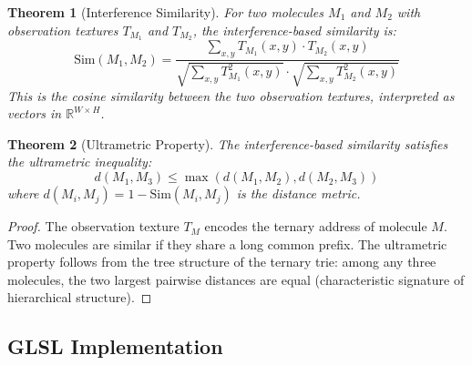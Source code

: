 \documentclass[11pt,a4paper]{article}
\newtheorem{theorem}{Theorem}[section]
\theoremstyle{definition}
\theoremstyle{remark}
\begin{document}
\begin{theorem}[Interference Similarity]
\label{thm:interference_similarity}
For two molecules $M_1$ and $M_2$ with observation textures $T_{M_1}$ and $T_{M_2}$, the interference-based similarity is:
\begin{equation}
\text{Sim}(M_1, M_2) = \frac{\sum_{x,y} T_{M_1}(x,y) \cdot T_{M_2}(x,y)}{\sqrt{\sum_{x,y} T_{M_1}^2(x,y)} \cdot \sqrt{\sum_{x,y} T_{M_2}^2(x,y)}}
\end{equation}
This is the cosine similarity between the two observation textures, interpreted as vectors in $\mathbb{R}^{W \times H}$.
\end{theorem}

\begin{theorem}[Ultrametric Property]
\label{thm:ultrametric_similarity}
The interference-based similarity satisfies the ultrametric inequality:
\begin{equation}
d(M_1, M_3) \leq \max(d(M_1, M_2), d(M_2, M_3))
\end{equation}
where $d(M_i, M_j) = 1 - \text{Sim}(M_i, M_j)$ is the distance metric.
\end{theorem}

\begin{proof}
The observation texture $T_M$ encodes the ternary address of molecule $M$. Two molecules are similar if they share a long common prefix. The ultrametric property follows from the tree structure of the ternary trie: among any three molecules, the two largest pairwise distances are equal (characteristic signature of hierarchical structure).
\end{proof}

\subsection{GLSL Implementation}
\end{document}
